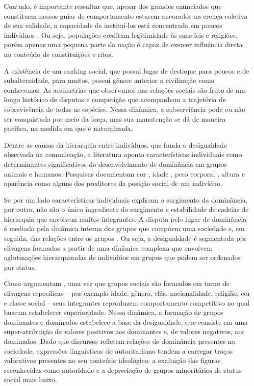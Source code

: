 \documentclass[
12pt,				%
openright,			%
twoside,			%
a4paper,			%
english,			%
french,				%
spanish,			%
brazil				%
]{abntex2}
\begin{document}
Contudo, é importante ressaltar que, apesar dos grandes enunciados que constituem nossos guias de comportamento estarem ancorados na crença coletiva de sua validade, a capacidade de instituí-los está concentrada em poucos indivíduos \cite{foucault1969archeologie}. Ou seja, populações creditam legitimidade às suas leis e religiões, porém apenas uma pequena parte da nação é capaz de exercer influência direta no conteúdo de constituições e ritos.

A existência de um ranking social, que possui lugar de destaque para poucos e de subalternidade, para muitos, possui gênese anterior a civilização como conhecemos. As assimetrias que observamos nas relações sociais são fruto de um longo histórico de disputas e competição que acompanham a trajetória de sobrevivência de todas as espécies. Nessa dinâmica, a subserviência pode ou não ser conquistada por meio da força, mas sua manutenção se dá de maneira pacífica, na medida em que é naturalizada. 

Dentre as causas da hierarquia entre indivíduos, que funda a desigualdade observada na comunicação, a literatura aponta características individuais como determinantes significativos do desenvolvimento de dominância em grupos animais e humanos. Pesquisas documentam cor \cite{bakker1983determinants}, idade \cite{cote2000dominance, bohlin2001determinants}, peso corporal \cite{morgan2000predictors}, altura \cite{huang2002camera} e aparência \cite{lawson2010looking, lodge2013rationalizing} como alguns dos preditores da posição social de um indivíduo.    

Se por um lado características individuais explicam o surgimento da dominância, por outro, não são o único ingrediente do surgimento e estabilidade de cadeias de hierarquia que envolvem muitos integrantes. A disputa pelo lugar de dominância é mediada pela dinâmica interna dos grupos que compõem uma sociedade \cite{ridgeway1989dominance} e, em seguida, das relações entre os grupos \cite{chase1980social,chase2002individual}. Ou seja, a desigualdade é segmentada por clivagens formadas a partir de uma dinâmica complexa que envolvem aglutinações hierarquizadas de individúos em grupos que podem ser ordenados por status.  

Como argumentam , uma vez que grupos sociais são formados em torno de clivagens específicas -- por exemplo idade, gênero, clãs, nacionalidade, religião, cor e classe social -- seus integrantes reproduzem comportamento competitivo no qual buscam estabelecer superioridade. Nessa dinâmica, a formação de grupos dominantes e dominados estabelece a base da desigualdade, que consiste em uma super-atribuição de valores positivos aos dominantes e, de valores negativos, aos dominados. Dado que discursos refletem relações de dominância presentes na sociedade, expressões linguísticas do autoritarismo tendem a carregar traços valorativos presentes no seu conteúdo ideológico: a exaltação das figuras reconhecidas como autoridade e a depreciação de grupos minoritários de status social mais baixo. 
\end{document}
